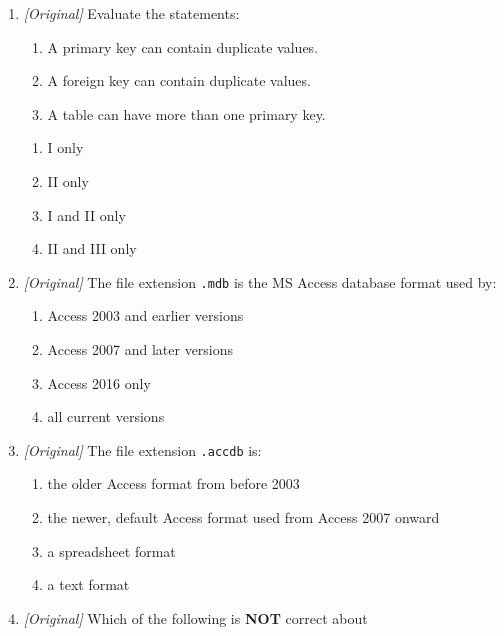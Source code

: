 \begin{enumerate}[label=\textbf{Q\arabic*.}, leftmargin=*]
  records when a parent record is deleted?
  \begin{enumerate}[label=\Alph*.]
    \item Cascade Update
    \item Cascade Delete
    \item Referential integrity
    \item Composite key
  \end{enumerate}
\item \textit{[Original]} Evaluate the statements:
  \begin{enumerate}[label=\Roman*.]
    \item A primary key can contain duplicate values.
    \item A foreign key can contain duplicate values.
    \item A table can have more than one primary key.
  \end{enumerate}
  \begin{enumerate}[label=\Alph*.]
    \item I only
    \item II only
    \item I and II only
    \item II and III only
  \end{enumerate}
\item \textit{[Original]} The file extension \texttt{.mdb} is the MS Access
  database format used by:
  \begin{enumerate}[label=\Alph*.]
    \item Access 2003 and earlier versions
    \item Access 2007 and later versions
    \item Access 2016 only
    \item all current versions
  \end{enumerate}
\item \textit{[Original]} The file extension \texttt{.accdb} is:
  \begin{enumerate}[label=\Alph*.]
    \item the older Access format from before 2003
    \item the newer, default Access format used from Access 2007 onward
    \item a spreadsheet format
    \item a text format
  \end{enumerate}
\item \textit{[Original]} Which of the following is \textbf{NOT} correct about

\end{enumerate}
